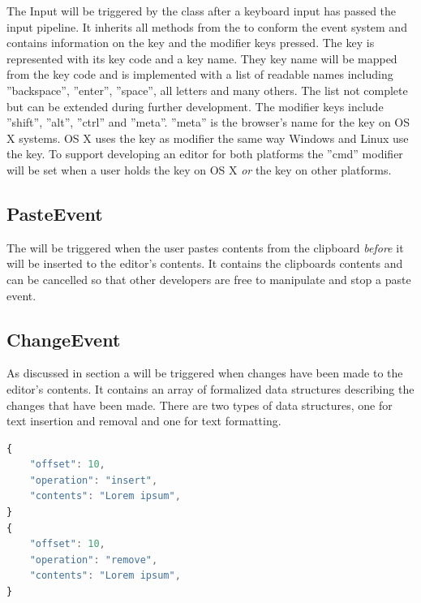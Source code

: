 The Input  will be triggered by the  class after a keyboard input has passed the input pipeline. It inherits all methods from the  to conform the event system and contains information on the key and the modifier keys pressed. The key is represented with its key code and a key name. They key name will be mapped from the key code and is implemented with a list of readable names including ''backspace'', ''enter'', ''space'', all letters and many others. The list not complete but can be extended during further development. The modifier keys include ''shift'', ''alt'', ''ctrl'' and ''meta''. ''meta'' is the browser's name for the  key on OS X systems. OS X uses the  key as modifier the same way Windows and Linux use the  key. To support developing an editor for both platforms the ''cmd'' modifier will be set when a user holds the  key on OS X \textit{or} the  key on other platforms.

\subsection{PasteEvent}
\label{subsec:paste_event}

The  will be triggered when the user pastes contents from the clipboard \textit{before} it will be inserted to the editor's contents. It contains the clipboards contents and can be cancelled so that other developers are free to manipulate and stop a paste event.

\subsection{ChangeEvent}
\label{subsec:change_event}

As discussed in section  a  will be triggered when changes have been made to the editor's contents. It contains an array of formalized data structures describing the changes that have been made. There are two types of data structures, one for text insertion and removal and one for text formatting.

\begin{lstlisting}[language=JavaScript, caption={Data structure for insert and remove operations}, label=lst:add_remove_structure]
{
    "offset": 10,
    "operation": "insert",
    "contents": "Lorem ipsum",
}
{
    "offset": 10,
    "operation": "remove",
    "contents": "Lorem ipsum",
}
\end{lstlisting}

